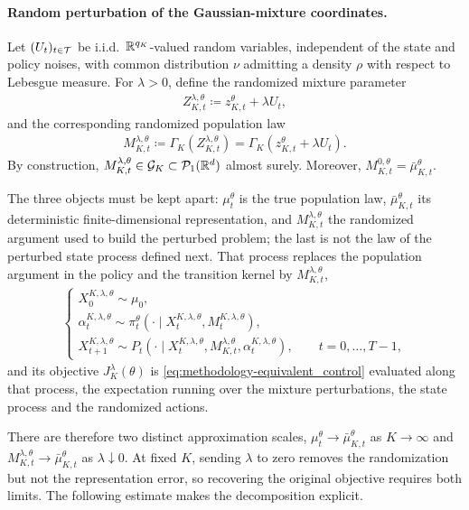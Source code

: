 \paragraph{Random perturbation of the Gaussian-mixture coordinates.}
Let $(U_t)_{t\in{\cal T}}$ be i.i.d.\ $\mathbb{R}^{q_K}$-valued random variables, independent of the state and policy noises, with common distribution $\nu$ admitting a density $\rho$ with respect to Lebesgue measure. For $\lambda>0$, define the randomized mixture parameter
\begin{align}
    \label{eq:gmm-random-parameter}
    Z_{K,t}^{\lambda,\theta}\coloneqq z_{K,t}^\theta + \lambda U_t,
\end{align}
and the corresponding randomized population law
\begin{align}
    \label{eq:gmm-random-law}
    M_{K,t}^{\lambda,\theta} \coloneqq \Gamma_K\left(Z_{K,t}^{\lambda,\theta}\right) = \Gamma_K\left( z_{K,t}^\theta+\lambda U_t\right).
\end{align}
By construction, $M_{K,t}^{\lambda,\theta}\in{\cal G}_K\subset{\cal P}_1(\mathbb{R}^d)$ almost surely. Moreover, $M_{K,t}^{0,\theta} = \bar\mu_{K,t}^\theta$.

The three objects must be kept apart: $\mu_t^\theta$ is the true population law, $\bar\mu_{K,t}^\theta$ its deterministic finite-dimensional representation, and $M_{K,t}^{\lambda,\theta}$ the randomized argument used to build the perturbed problem; the last is not the law of the perturbed state process defined next. That process replaces the population argument in the policy and the transition kernel by $M_{K,t}^{\lambda,\theta}$,
\begin{align}
    \label{eq:gmm-perturbed-process}
    \begin{cases}
        X_0^{K,\lambda,\theta}\sim\mu_0,\\
        \alpha_t^{K,\lambda,\theta}\sim\pi_t^\theta\left(\cdot\mid X_t^{K,\lambda,\theta},M_t^{K,\lambda,\theta}\right),\\
        X_{t+1}^{K,\lambda,\theta} \sim P_t\left(\cdot\mid X_t^{K,\lambda,\theta},M_{K,t}^{\lambda,\theta}, \alpha_t^{K,\lambda,\theta}\right),\qquad t=0,\ldots,T-1,
    \end{cases}
\end{align}
and its objective $J_K^\lambda(\theta)$ is \eqref{eq:methodology-equivalent_control} evaluated along that process, the expectation running over the mixture perturbations, the state process and the randomized actions.

There are therefore two distinct approximation scales, $\mu_t^\theta\to\bar\mu_{K,t}^\theta$ as $K\to\infty$ and $M_{K,t}^{\lambda,\theta}\to\bar\mu_{K,t}^\theta$ as $\lambda\downarrow0$. At fixed $K$, sending $\lambda$ to zero removes the randomization but not the representation error, so recovering the original objective requires both limits. The following estimate makes the decomposition explicit.

